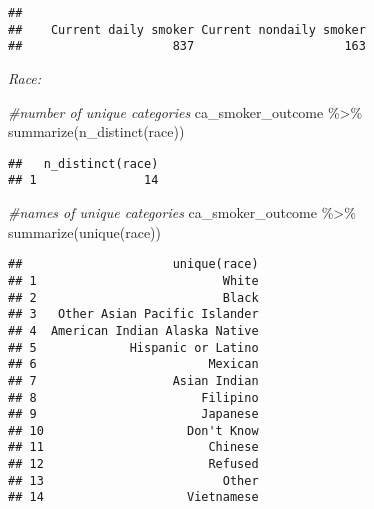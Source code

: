\documentclass[
]{article}
\newenvironment{Shaded}{\begin{snugshade}}{\end{snugshade}}
\newcommand{\CommentTok}[1]{\textcolor[rgb]{0.56,0.35,0.01}{\textit{#1}}}
\newcommand{\FunctionTok}[1]{\textcolor[rgb]{0.00,0.00,0.00}{#1}}
\newcommand{\NormalTok}[1]{#1}
\newcommand{\SpecialCharTok}[1]{\textcolor[rgb]{0.00,0.00,0.00}{#1}}
\begin{document}
\begin{Shaded}
\end{Shaded}

\begin{verbatim}
## 
##    Current daily smoker Current nondaily smoker 
##                     837                     163
\end{verbatim}

\emph{Race:}

\begin{Shaded}
\begin{Highlighting}[]
\CommentTok{\#number of unique categories }
\NormalTok{ca\_smoker\_outcome }\SpecialCharTok{\%\textgreater{}\%} \FunctionTok{summarize}\NormalTok{(}\FunctionTok{n\_distinct}\NormalTok{(race))}
\end{Highlighting}
\end{Shaded}

\begin{verbatim}
##   n_distinct(race)
## 1               14
\end{verbatim}

\begin{Shaded}
\begin{Highlighting}[]
\CommentTok{\#names of unique categories }
\NormalTok{ca\_smoker\_outcome }\SpecialCharTok{\%\textgreater{}\%} \FunctionTok{summarize}\NormalTok{(}\FunctionTok{unique}\NormalTok{(race))}
\end{Highlighting}
\end{Shaded}

\begin{verbatim}
##                     unique(race)
## 1                          White
## 2                          Black
## 3   Other Asian Pacific Islander
## 4  American Indian Alaska Native
## 5             Hispanic or Latino
## 6                        Mexican
## 7                   Asian Indian
## 8                       Filipino
## 9                       Japanese
## 10                    Don't Know
## 11                       Chinese
## 12                       Refused
## 13                         Other
## 14                    Vietnamese
\end{verbatim}

\begin{Shaded}
\end{Shaded}
\end{document}
